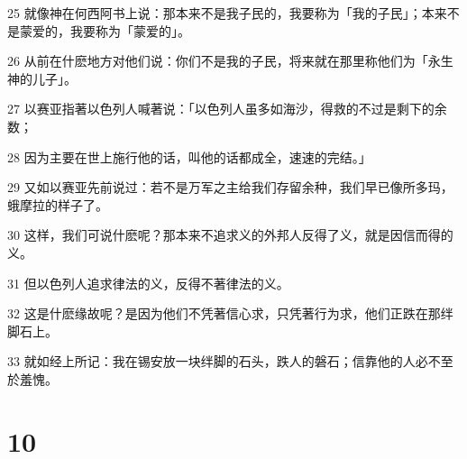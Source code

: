 \par 25 就像神在何西阿书上说：那本来不是我子民的，我要称为「我的子民」；本来不是蒙爱的，我要称为「蒙爱的」。
\par 26 从前在什麽地方对他们说：你们不是我的子民，将来就在那里称他们为「永生神的儿子」。
\par 27 以赛亚指著以色列人喊著说：「以色列人虽多如海沙，得救的不过是剩下的余数；
\par 28 因为主要在世上施行他的话，叫他的话都成全，速速的完结。」
\par 29 又如以赛亚先前说过：若不是万军之主给我们存留余种，我们早已像所多玛，蛾摩拉的样子了。
\par 30 这样，我们可说什麽呢？那本来不追求义的外邦人反得了义，就是因信而得的义。
\par 31 但以色列人追求律法的义，反得不著律法的义。
\par 32 这是什麽缘故呢？是因为他们不凭著信心求，只凭著行为求，他们正跌在那绊脚石上。
\par 33 就如经上所记：我在锡安放一块绊脚的石头，跌人的磐石；信靠他的人必不至於羞愧。

\chapter{10}


